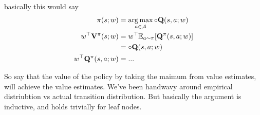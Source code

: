 
    basically this would say
    \begin{align}
        \pi(s;w) &= \operatorname*{arg\,max}_{a\in\mathcal{A}} \circ{\mathbf{Q}}(s,a;w) \\
        w^\top\mathbf{V}^\pi(s;w) &= w^\top \mathbb{E}_{a\sim\pi}[ \mathbf{Q}^\pi(s,a;w)] \\
            &= \circ{\mathbf{Q}}(s,a;w) \\
        w^\top\mathbf{Q}^\pi(s,a;w) &= ...    
    \end{align}

    So say that the value of the policy by taking the maimum from value estimates, will achieve the value estimates. We've been handwavy around empirical distriubtion vs actual transition distribution. But basically the argument is inductive, and holds trivially for leaf nodes.









